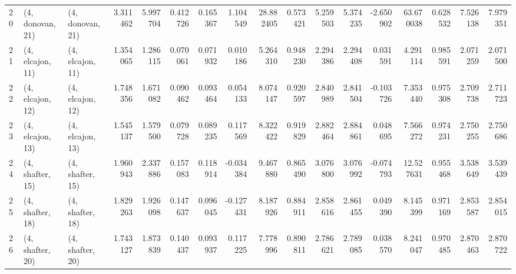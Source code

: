 \begin{tabular}{lllrrrrrrrrrrrrrr}
20 &  (4, donovan, 21) &  (4, donovan, 21) &  3.311462 &  5.997704 &   0.412726 &  0.165367 &  1.104549 &  28.882405 &  0.573421 &   5.259503 &  5.374235 & -2.650902 &  63.670038 &  0.628532 &  7.526138 &  7.979351 \\
21 &  (4, elcajon, 11) &  (4, elcajon, 11) &  1.354065 &  1.286115 &   0.070061 &  0.071932 &  0.010186 &   5.264310 &  0.948230 &   2.294386 &  2.294408 &  0.031591 &   4.291114 &  0.985591 &  2.071259 &  2.071500 \\
22 &  (4, elcajon, 12) &  (4, elcajon, 12) &  1.748356 &  1.671082 &   0.090462 &  0.093464 &  0.054133 &   8.074147 &  0.920597 &   2.840989 &  2.841504 & -0.103726 &   7.353440 &  0.975308 &  2.709738 &  2.711723 \\
23 &  (4, elcajon, 13) &  (4, elcajon, 13) &  1.545137 &  1.579500 &   0.079728 &  0.089235 &  0.117569 &   8.322422 &  0.919829 &   2.882464 &  2.884861 &  0.048695 &   7.566272 &  0.974231 &  2.750255 &  2.750686 \\
24 &  (4, shafter, 15) &  (4, shafter, 15) &  1.960943 &  2.337886 &   0.157083 &  0.118914 & -0.034384 &   9.467880 &  0.865490 &   3.076800 &  3.076992 & -0.074793 &  12.527631 &  0.955468 &  3.538649 &  3.539439 \\
25 &  (4, shafter, 18) &  (4, shafter, 18) &  1.829263 &  1.926098 &   0.147637 &  0.096045 & -0.127431 &   8.187926 &  0.884911 &   2.858616 &  2.861455 &  0.049390 &   8.145399 &  0.971169 &  2.853587 &  2.854015 \\
26 &  (4, shafter, 20) &  (4, shafter, 20) &  1.743127 &  1.873839 &   0.140437 &  0.093937 &  0.117225 &   7.778996 &  0.890811 &   2.786621 &  2.789085 &  0.038570 &   8.241047 &  0.970485 &  2.870463 &  2.870722 \\
\bottomrule
\end{tabular}
